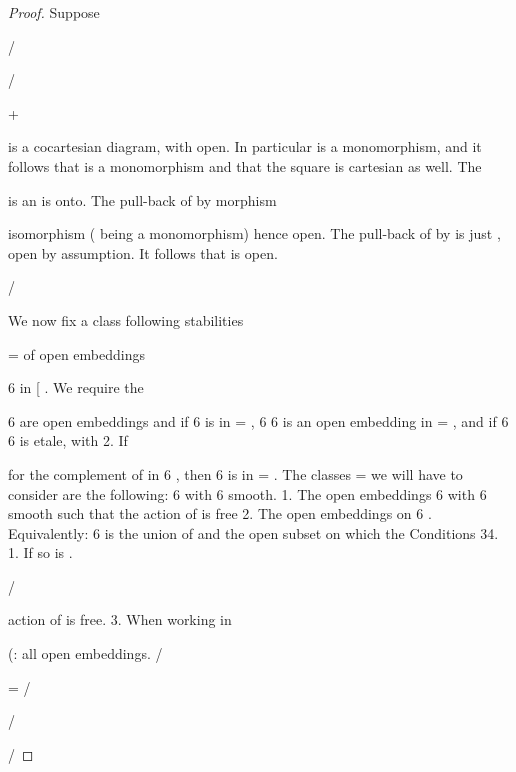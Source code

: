 \documentclass[11pt,a4paper]{article}
\theoremstyle{plain}
\theoremstyle{definition}
\begin{document}
\begin{proof} Suppose

/ 






/  





+








is a cocartesian diagram, with open. In particular is a monomorphism, and it
follows that  is a monomorphism and that the square is cartesian as well. The

 is an
 is onto. The pull-back of  by 
morphism 


isomorphism ( being a monomorphism) hence open. The pull-back of by
 is just , open by assumption. It follows that  is open.




/







We now fix a class
following stabilities

= of open embeddings 



6 in [ . We require the

6 are open embeddings and if  6 is in = ,
6
6 is an open embedding in = , and if  6  6 is etale, with
2. If 


     for  the complement of  in 6 , then    6  is in = .
The classes = we will have to consider are the following:
6 with 6 smooth.
1. The open embeddings 
6 with 6 smooth such that the action of is free
2. The open embeddings 
on 6   . Equivalently: 6 is the union of  and the open subset on which the
Conditions 34. 1. If
so is 
.





/



action of is free.
3. When working in

(: all open embeddings.
 /

=
/

/

/

\end{proof}
\end{document}
